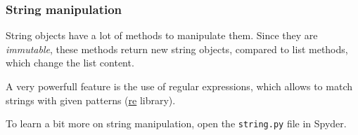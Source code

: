     \begin{frame}[fragile]
        \frametitle{String manipulation}

        String objects have a lot of methods to manipulate them. 
        \vspace{1em}
        Since they 
        are \emph{immutable}, these methods return new string objects, compared to list methods, which
        change the list content.

    \vspace{1em}
    A very powerfull feature is the use of regular expressions, which allows to match strings with given patterns (\href{https://docs.python.org/3/library/re.html}{re} library).

    \vspace{1em}
    To learn a bit more on string manipulation, open the \verb+string.py+ file in Spyder.
\end{frame}

